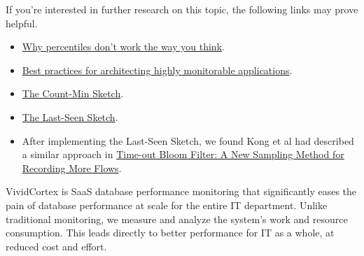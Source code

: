 \documentclass{vivid_layout}
\begin{document}
If you're interested in further research on this topic, the following links may
prove helpful.

\begin{itemize}

\item \href{https://www.vividcortex.com/blog/why-percentiles-dont-work-the-way-you-think}{Why percentiles don't work the way you think}.
\item \href{https://www.vividcortex.com/resources/architecting-highly-monitorable-apps}{Best practices for architecting highly monitorable applications}.
\item \href{https://en.wikipedia.org/wiki/Count\%E2\%80\%93min\_sketch}{The Count-Min Sketch}.
\item \href{https://github.com/VividCortex/lastseen}{The Last-Seen Sketch}.
\item After implementing the Last-Seen Sketch, we found Kong et al had described
a similar approach in
\href{http://pages.cs.wisc.edu/~krobin/documents/kong06icoin.pdf}{Time-out Bloom Filter: A New Sampling Method for Recording More Flows}.

\end{itemize}

\newpage

\begin{about}	%
VividCortex is SaaS database performance monitoring that significantly eases the pain of database performance at scale for the entire IT department. Unlike traditional monitoring, we measure
and analyze the system's work and resource consumption. This leads directly to better performance for IT as a whole, at reduced cost and effort.
\end{about}
\makeresources	%
\end{document}
